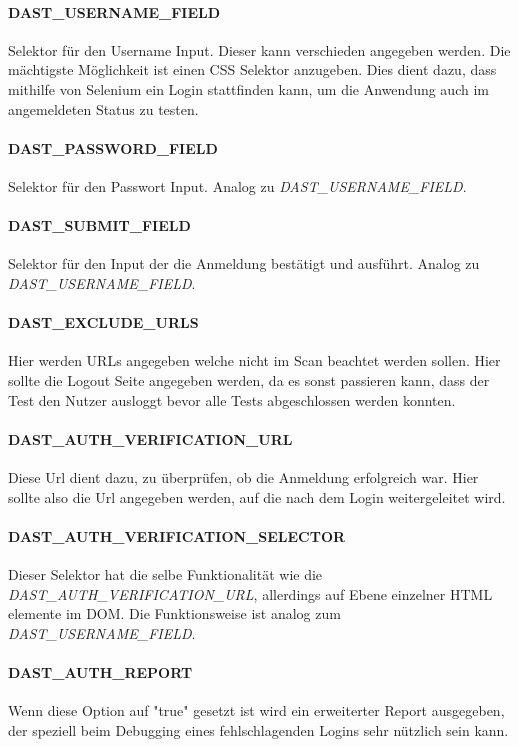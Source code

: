 \paragraph{DAST\_USERNAME\_FIELD}
Selektor für den Username Input.
Dieser kann verschieden angegeben werden.
Die mächtigste Möglichkeit ist einen CSS Selektor anzugeben.
Dies dient dazu, dass mithilfe von Selenium ein Login stattfinden kann, um die Anwendung auch im angemeldeten Status zu testen.
\paragraph{DAST\_PASSWORD\_FIELD}
Selektor für den Passwort Input.
Analog zu \textit{DAST\_USERNAME\_FIELD}.
\paragraph{DAST\_SUBMIT\_FIELD}
Selektor für den Input der die Anmeldung bestätigt und ausführt.
Analog zu \textit{DAST\_USERNAME\_FIELD}.
\paragraph{DAST\_EXCLUDE\_URLS}
Hier werden URLs angegeben welche nicht im Scan beachtet werden sollen.
Hier sollte die Logout Seite angegeben werden, da es sonst passieren kann, dass der Test den Nutzer ausloggt bevor alle Tests abgeschlossen werden konnten.
\paragraph{DAST\_AUTH\_VERIFICATION\_URL}
Diese Url dient dazu, zu überprüfen, ob die Anmeldung erfolgreich war.
Hier sollte also die Url angegeben werden, auf die nach dem Login weitergeleitet wird.
\paragraph{DAST\_AUTH\_VERIFICATION\_SELECTOR}
Dieser Selektor hat die selbe Funktionalität wie die \textit{DAST\_AUTH\_VERIFICATION\_URL}, allerdings auf Ebene einzelner HTML elemente im DOM.
Die Funktionsweise ist analog zum \textit{DAST\_USERNAME\_FIELD}.
\paragraph{DAST\_AUTH\_REPORT}
Wenn diese Option auf "true" gesetzt ist wird ein erweiterter Report ausgegeben, der speziell beim Debugging eines fehlschlagenden Logins sehr nützlich sein kann.

